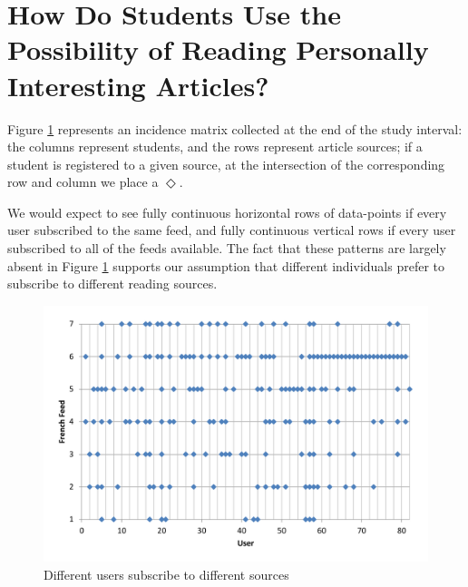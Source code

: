 
\section{How Do Students Use the Possibility of Reading Personally Interesting Articles?}
\label{sec:results}


Figure \ref{fig:subscriptions} represents an incidence matrix collected at the end of the study interval: the columns represent students, and the rows represent article sources; if a student is registered to a given source, at the intersection of the corresponding row and column we place a $\Diamond$. 

We would expect to see fully continuous horizontal rows of data-points if every user subscribed to the same feed, and fully continuous vertical rows if every user subscribed to all of the feeds available. The fact that these patterns are largely absent in Figure \ref{fig:subscriptions} supports our assumption that different individuals prefer to subscribe to different reading sources.


\begin{figure}[h!]

\centering
  \includegraphics[width=\columnwidth]{figures/users_feeds}
  \caption{Different users subscribe to different sources}
  \label{fig:subscriptions}  
\end{figure}

